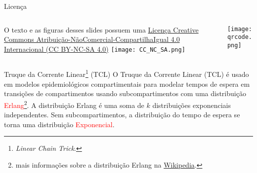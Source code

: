 \maketitle

\begin{frame}{Licença}
    \begin{columns}
        \begin{column}{0.5\textwidth}
            O texto e as figuras desses slides possuem uma
            \href{https://creativecommons.org/licenses/by-nc-sa/4.0/deed.pt}{Licença
            Creative Commons
            Atribuição-NãoComercial-CompartilhaIgual 4.0 Internacional (CC BY-NC-SA 4.0)}
            \vfill
            \centering
            \vspace{1em}
            \texttt{[image: CC\_NC\_SA.png]}
        \end{column}
        \begin{column}{0.5\textwidth}
            \centering
            \texttt{[image: qrcode.png]}
        \end{column}
    \end{columns}
    \vfill
\end{frame}

\begin{frame}{Truque da Corrente Linear\footnote{\textit{Linear Chain Trick}.} (TCL)}
	O Truque da Corrente Linear (TCL) \parencite{hurtadoGeneralizationsLinearChain2019, hurtadoProcedureDerivingNew2020, andoHowFastLinear2020}
	é usado em modelos epidemiológicos compartimentais para
	modelar tempos de espera em transições de compartimentos usando
	subcompartimentos com uma distribuição \textcolor{red}{Erlang}\footnote{mais informações
	sobre a distribuição Erlang na \href{https://en.wikipedia.org/wiki/Erlang_distribution}{Wikipedia}.}.
	\vfill
	A distribuição Erlang é uma soma de $k$ distribuições exponenciais
	independentes.
	\vfill
	Sem subcompartimentos, a distribuição do tempo de espera se torna uma
	distribuição \textcolor{red}{Exponencial}.
\end{frame}

